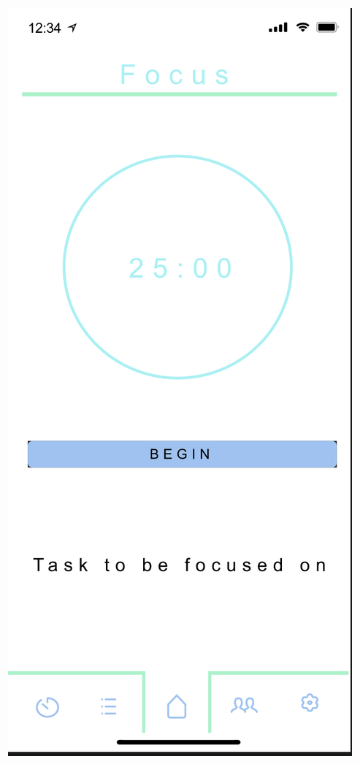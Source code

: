 \begin{figure}[H]
    \hfill
    \begin{subfigure}[b]{0.3\textwidth}
        \centering
        \includegraphics[width=\textwidth]{./graphics/design/Focus Colour.png}

\end{subfigure}
\end{figure}
